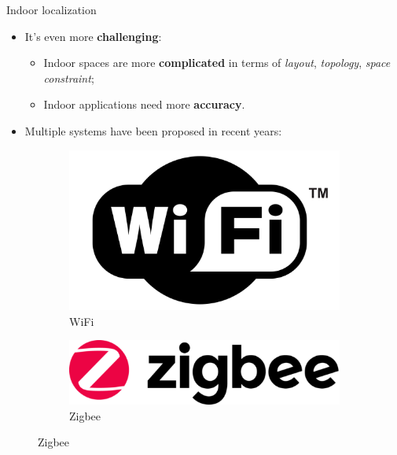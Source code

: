 \begin{frame}{Indoor localization}
    \begin{itemize}
        \item It's even more \textbf{challenging}:
            \begin{itemize}
                \item Indoor spaces are more \textbf{complicated} in terms of \textit{layout}, \textit{topology}, \textit{space constraint};\item Indoor applications need more \textbf{accuracy}.
            \end{itemize}
        \item Multiple systems have been proposed in recent years:
        \end{itemize}
    
        \begin{figure}[!htb]
            \centering
            \begin{subfigure}[t]{0.24\textwidth}
                \centering
                \includegraphics[width=\linewidth]{images/wifi.png}
                \caption{WiFi}
                \label{fig:wifi}
            \end{subfigure}
            \hfill
            \begin{subfigure}[t]{0.24\textwidth}
                \centering
                \includegraphics[width=\linewidth]{images/zigbee.png}
                \caption{Zigbee}
                \label{fig:zigbee}

\end{subfigure}
\end{figure}
\end{frame}
